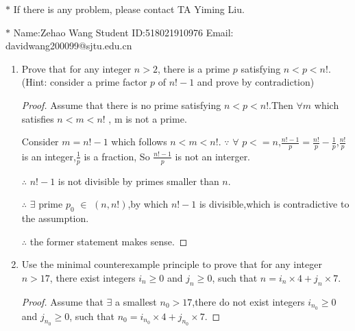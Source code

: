 \documentclass[12pt,a4paper]{article}
\theoremstyle{definition}
\begin{document}
\noindent

\noindent{}
\begin{center}
\footnotesize{\color{red}$*$ If there is any problem, please contact TA Yiming Liu.}

\footnotesize{\color{blue}$*$ Name:Zehao Wang  \quad Student ID:518021910976 \quad Email: davidwang200099@sjtu.edu.cn}
\end{center}

\begin{enumerate}
    \item
    Prove that for any integer $n>2$, there is a prime $p$ satisfying $n<p<n!$. {\color{blue}(Hint: consider a prime factor $p$ of $n!-1$ and prove by contradiction)}
    \begin{proof}
      
      Assume that there is no prime satisfying $n<p<n!$.Then $\forall$$m$ which satisfies $n<m<n!$ ,
      m is not a prime.
      
      Consider $m=n!-1$ which follows $n<m<n!$. $\because$ $\forall$ $p<=n$,$\frac{n!-1}{p}=\frac{n!}{p}-\frac{1}{p}$,$\frac{n!}{p}$ is an integer,$\frac{1}{p}$ is a fraction, So $\frac{n!-1}{p}$ is not an interger.
      
      $\therefore$ $n!-1$ is not divisible by primes smaller than $n$.
      
      $\therefore$ $\exists$ prime $p_0$ $\in$ $(n,n!)$,by which $n!-1$ is divisible,which is contradictive to the assumption.
      
      $\therefore$ the former statement makes sense.
      
    \end{proof}

    \item
    Use the minimal counterexample principle to prove that for any integer $n>17$, there exist integers $i_n\ge 0$ and $j_n\ge 0$, such that $n = i_n \times 4 + j_n \times 7$.
    \begin{proof}
        
        Assume that $\exists$ a smallest $n_0>17$,there do not exist integers $i_{n_0}\ge0$ and $j_{n_0}\ge0$, such that $n_0 = i_{n_0} \times 4 + j_{n_0} \times 7$.
        

\end{proof}
\end{enumerate}
\end{document}
